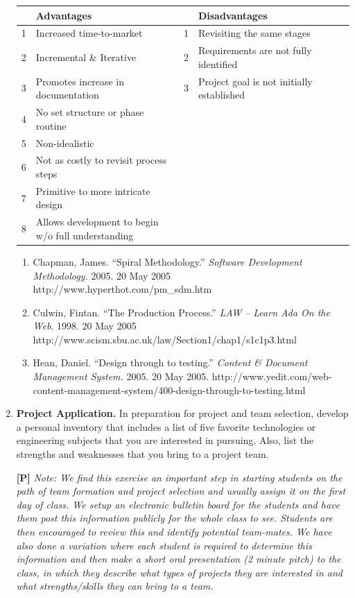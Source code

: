 \begin{enumerate}
\begin{onlysolution}
\begin{tabular}{ll   ll}\\ 
   & Advantages 						&    & Disadvantages			 \\ \hline
1 & Increased time-to-market 			& 1 & Revisiting the same stages  	\\
2 & Incremental \& Iterative 				& 2 & Requirements are not fully identified  \\
3 & Promotes increase in documentation 		& 3 & Project goal is not initially established  \\
4 & No set structure or phase routine 		&    &   \\
5 & Non-idealistic 					&    &   \\
6 & Not as costly to revisit process steps 		&    &   \\
7 & Primitive to more intricate design 		&    &  \\
8 & 
	\makecell{Allows development to begin \\ w/o full understanding} & &   \\
\end{tabular}

\begin{enumerate}[(1.)]
\item Chapman, James. ``Spiral Methodology.'' \emph{Software Development
Methodology.} 2005. 20 May 2005 http://www.hyperthot.com/pm\_sdm.htm 
\item Culwin, Fintan. ``The Production Process.'' \emph{LAW -- Learn Ada On
the Web}. 1998. 20 May 2005 
http://www.scism.sbu.ac.uk/law/Section1/chap1/s1c1p3.html
\item Hean, Daniel. ``Design through to testing.'' \emph{Content \& Document
Management System.} 2005. 20 May 2005.
http://www.yedit.com/web-content-management-system/400-design-through-to-testing.html
\end{enumerate}
 
 \end{onlysolution}
 

\item
  \textbf{Project Application.} In preparation for project and team
  selection, develop a personal inventory that includes a list of five
  favorite technologies or engineering subjects that you are interested
  in pursuing. Also, list the strengths and weaknesses that you bring to
  a project team.
  
  \begin{onlysolution}
 \textbf{[P]}
\itshape
Note: We find this exercise an important step in starting
students on the path of team formation and project selection and usually
assign it on the first day of class. We setup an electronic bulletin
board for the students and have them post this information publicly for
the whole class to see. Students are then encouraged to review this and
identify potential team-mates. We have also done a variation where each
student is required to determine this information and then make a short
oral presentation (2 minute pitch) to the class, in which they describe
what types of projects they are interested in and what strengths/skills
they can bring to a team.
\end{onlysolution}

\end{enumerate}
